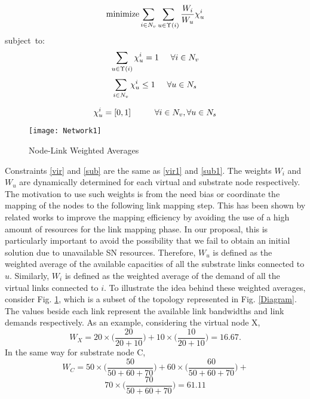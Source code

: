 \documentclass[journal]{IEEEtran}
\def\Min{{\rm minimize }}
\def\ST{{\rm subject\ to}}
\begin{document}
\begin{equation}
\Min\sum\limits_{{i \in N_v}} \sum\limits_{{u \in \Upsilon(i)}}\frac{W_{i}}{W_{u}}\chi_{u}^{i}
\label{eqn:PaGeViNE}
\end{equation}
\ST:
\begin{equation}
\sum\limits_{u \in \Upsilon(i)}\chi_{u}^{i} = 1 \hspace{5 mm}\forall {i \in N_v}
\label{vir}
\end{equation}
\begin{equation}
\sum\limits_{i \in N_v}\chi_{u}^{i} \leq 1 \hspace{5 mm}\forall {u \in N_s}
\label{sub}
\end{equation}

$$\chi_{u}^{i} = [0,1] \hspace{10 mm} \forall i \in N_v, \forall u \in N_s$$
\begin{figure}
  {\texttt{[image: Network1]}}
  \caption{Node-Link Weighted Averages}\label{Diagram1}
\end{figure}
Constraints \eqref{vir} and \eqref{sub} are the same as \eqref{vir1} and \eqref{sub1}. The weights $W_{i}$ and $W_{u}$ are dynamically determined for each virtual and substrate node respectively. The motivation to use such weights is from the need bias or coordinate the mapping of the nodes to the following link mapping step. This has been shown by related works to improve the mapping efficiency \cite{Chowdhury12} by avoiding the use of a high amount of resources for the link mapping phase. In our proposal, this is particularly important to avoid the possibility that we fail to obtain an initial solution due to unavailable \ac{SN} resources. Therefore, $W_{u}$ is defined as the weighted average of the available capacities of all the substrate links connected to $u$. Similarly, $W_{i}$ is defined as the weighted average of the demand of all the virtual links connected to $i$. To illustrate the idea behind these weighted averages, consider Fig. \ref{Diagram1}, which is a subset of the topology represented in Fig. \ref{Diagram}. The values beside each link represent the available link bandwidths and link demands respectively. As an example, considering the virtual node X,
\begingroup
\fontsize{9pt}{9pt}
$$W_{X} = 20\times\Bigg(\frac{20}{20+10}\Bigg)+10\times\Bigg(\frac{10}{20+10}\Bigg) = 16.67.$$
\endgroup
In the same way for substrate node C,
\begingroup
\fontsize{9pt}{9pt}
$$W_{C} = 50\times\Bigg(\frac{50}{50+60+70}\Bigg)+60\times\Bigg(\frac{60}{50+60+70}\Bigg)+$$$$70\times\Bigg(\frac{70}{50+60+70}\Bigg) = 61.11$$
\end{document}
